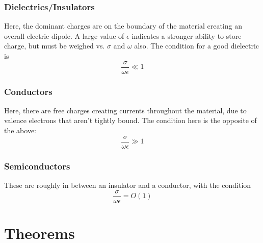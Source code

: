 \documentclass{article}
\numberwithin{equation}{section}
\begin{document}
        \subsubsection{Dielectrics/Insulators}
            Here, the dominant charges are on the boundary of the material creating an
            overall electric dipole. A large value of $\epsilon$ indicates a stronger
            ability to store charge, but must be weighed vs. $\sigma$ and $\omega$ also.
            The condition for a good dielectric is
            \begin{equation} 
                \frac{\sigma}{\omega \epsilon} \ll 1
            \end{equation}

        \subsubsection{Conductors}
            Here, there are free charges creating currents throughout the material, due to
            valence electrons that aren't tightly bound. The condition here is the
            opposite of the above:
            \begin{equation} \label{eq:conductor}
                \frac{\sigma}{\omega \epsilon} \gg 1
            \end{equation}

        \subsubsection{Semiconductors}
            These are roughly in between an insulator and a conductor, with the condition
                \begin{equation} \label{eq:semiconductor}
                    \frac{\sigma}{\omega \epsilon} = O(1)
                \end{equation}
            \newpage

    \section{Theorems}
\end{document}

